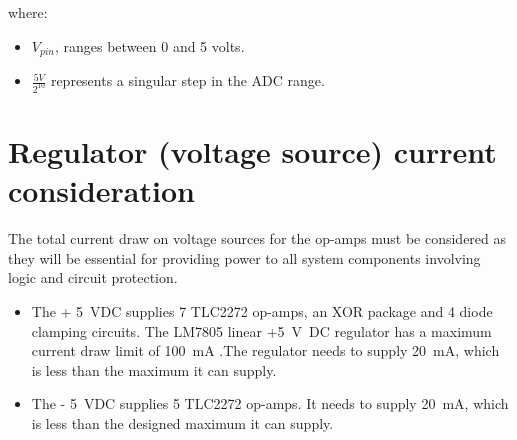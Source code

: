 \begin{itemize}
    where:
    \begin{itemize}
        \item $V_{pin}$, ranges between 0 and 5 volts.
        \item $\frac{5V}{2^{10}}$ represents a singular step in the ADC range.
    \end{itemize}
\end{itemize}


\section{Regulator (voltage source) current consideration}\label{sec:rationale_system}

The total current draw on voltage sources for the op-amps must be considered as they will be essential for providing power to all system components involving logic and circuit protection.

\begin{itemize}
    \item The + \SI{5}{VDC} supplies 7 TLC2272 op-amps, an XOR package and 4 diode clamping circuits. The  LM7805 linear +\SI{5}{\volt DC} regulator has a maximum current draw limit of \SI{100}{\milli\ampere} \cite{LM7805}.The regulator needs to supply \SI{20}{\milli\ampere}, which is less than the maximum it can supply.
    \item The - \SI{5}{VDC} supplies 5 TLC2272 op-amps. It needs to supply \SI{20}{\milli\ampere}, which is less than the designed maximum it can supply.
\end{itemize}










